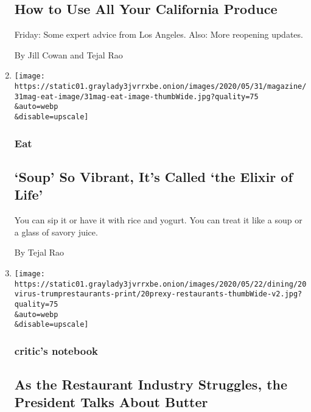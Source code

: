 \begin{enumerate}
  \hypertarget{how-to-use-all-your-california-produce}{%
  \subsection{How to Use All Your California
  Produce}\label{how-to-use-all-your-california-produce}}

  Friday: Some expert advice from Los Angeles. Also: More reopening
  updates.

  By Jill Cowan and Tejal Rao
\item
  \href{/2020/05/27/magazine/soup-so-vibrant-its-called-the-elixir-of-life.html}{}

  \texttt{[image: https://static01.graylady3jvrrxbe.onion/images/2020/05/31/magazine/31mag-eat-image/31mag-eat-image-thumbWide.jpg?quality=75\\\&auto=webp\\\&disable=upscale]}

  \hypertarget{eat}{%
  \subsubsection{Eat}\label{eat}}

  \hypertarget{soup-so-vibrant-its-called-the-elixir-of-life}{%
  \subsection{`Soup' So Vibrant, It's Called `the Elixir of
  Life'}\label{soup-so-vibrant-its-called-the-elixir-of-life}}

  You can sip it or have it with rice and yogurt. You can treat it like
  a soup or a glass of savory juice.

  By Tejal Rao
\item
  \href{/2020/05/21/dining/white-house-trump-restaurant-panel-meeting.html}{}

  \texttt{[image: https://static01.graylady3jvrrxbe.onion/images/2020/05/22/dining/20virus-trumprestaurants-print/20prexy-restaurants-thumbWide-v2.jpg?quality=75\\\&auto=webp\\\&disable=upscale]}

  \hypertarget{critics-notebook-4}{%
  \subsubsection{critic's notebook}\label{critics-notebook-4}}

  \hypertarget{as-the-restaurant-industry-struggles-the-president-talks-about-butter}{%
  \subsection{As the Restaurant Industry Struggles, the President Talks
  About
  Butter}\label{as-the-restaurant-industry-struggles-the-president-talks-about-butter}}


\end{enumerate}
